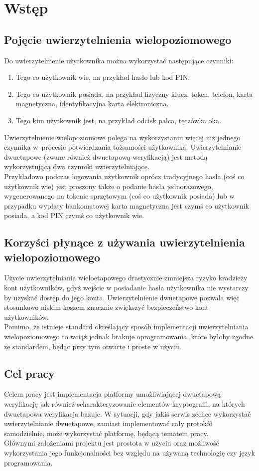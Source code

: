 \chapter{Wstęp}

\section{Pojęcie uwierzytelnienia wielopoziomowego}
Do uwierzytelnienie użytkownika można wykorzystać następujące czynniki:
\begin{enumerate}
	\item Tego co użytkownik wie, na przykład hasło lub kod PIN.
	\item Tego co użytkownik posiada, na przykład fizyczny klucz, token, telefon, karta magnetyczna, identyfikacyjna karta elektroniczna.
	\item Tego kim użytkownik jest, na przykład odcisk palca, tęczówka oka.
\end{enumerate}
Uwierzytelnienie wielopoziomowe polega na wykorzystaniu więcej niż jednego czynnika w~procesie potwierdzania tożsamości użytkownika.
Uwierzytelnianie dwuetapowe (zwane również dwuetapową weryfikacją) jest metodą wykorzystującą dwa czynniki uwierzytelniające. \\
Przykładowo podczas logowania użytkownik oprócz tradycyjnego hasła (coś co użytkownik wie) jest proszony także
o podanie hasła jednorazowego, wygenerowanego na tokenie sprzętowym (coś co użytkownik posiada) lub 
w przypadku wypłaty bankomatowej karta magnetyczna jest czymś co użytkownik posiada, a kod PIN czymś co użytkownik wie.

\section{Korzyści płynące z używania uwierzytelnienia wielopoziomowego}
Użycie uwierzytelniania wieloetapowego drastycznie zmniejsza ryzyko kradzieży kont użytkowników, gdyż 
wejście w posiadanie hasła użytkownika nie wystarczy by uzyskać dostęp do jego konta.
Uwierzytelnienie dwuetapowe pozwala więc stosunkowo niskim koszem znacznie zwiększyć bezpieczeństwo kont użytkowników. \\
Pomimo, że istnieje standard określający sposób implementacji uwierzytelniania wielopoziomowego to wciąż jednak brakuje oprogramowania, 
które byłoby zgodne ze standardem, będąc przy tym otwarte i proste w użyciu. 

\section{Cel pracy}
Celem pracy jest implementacja platformy umożliwiającej dwuetapową weryfikację jak również scharakteryzowanie 
elementów kryptografii, na których dwuetapowa weryfikacja bazuje. 
W sytuacji, gdy jakiś serwis zechce wykorzystać uwierzytelnianie dwuetapowe,
zamiast implementować cały protokół samodzielnie, może wykorzystać platformę, będącą tematem pracy. \\
Głównymi założeniami projektu jest prostota w użyciu oraz możliwość wykorzystania jego funkcjonalności 
bez względu na używaną technologię czy język programowania.